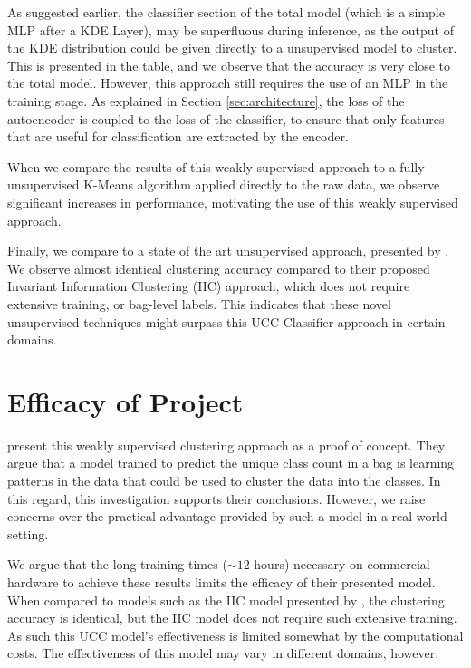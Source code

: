 \documentclass{article} %
\begin{document}
As suggested earlier, the classifier section of the total model (which is a simple MLP after a KDE Layer), may be superfluous during inference, as the output of the KDE distribution could be given directly to a unsupervised model to cluster. This is presented in the table, and we observe that the accuracy is very close to the total model. However, this approach still requires the use of an MLP in the training stage. As explained in Section \ref{sec:architecture}, the loss of the autoencoder is coupled to the loss of the classifier, to ensure that only features that are useful for classification are extracted by the encoder.

When we compare the results of this weakly supervised approach to a fully unsupervised K-Means algorithm applied directly to the raw data, we observe significant increases in performance, motivating the use of this weakly supervised approach. 

Finally, we compare to a state of the art unsupervised approach, presented by \cite{ji2019invariant}. We observe almost identical clustering accuracy compared to their proposed Invariant Information Clustering (IIC) approach, which does not require extensive training, or bag-level labels. This indicates that these novel unsupervised techniques might surpass this UCC Classifier approach in certain domains.

\section{Efficacy of Project}

\cite{Oner2019} present this weakly supervised clustering approach as a proof of concept. They argue that a model trained to predict the unique class count in a bag is learning patterns in the data that could be used to cluster the data into the classes. In this regard, this investigation supports their conclusions. However, we raise concerns over the practical advantage provided by such a model in a real-world setting.

We argue that the long training times ($\sim12$ hours) necessary on commercial hardware to achieve these results limits the efficacy of their presented model. When compared to models such as the IIC model presented by \cite{ji2019invariant}, the clustering accuracy is identical, but the IIC model does not require such extensive training. As such this UCC model's effectiveness is limited somewhat by the computational costs. The effectiveness of this model may vary in different domains, however.
\end{document}
